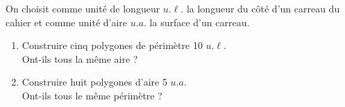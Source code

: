 \begin{exercice}
    On choisit comme unité de longueur $u.\ell.$ la longueur du côté d'un carreau du cahier et comme unité d'aire $u.a.$ la surface d'un carreau.
    \begin{enumerate}
       \item Construire cinq polygones de périmètre 10 $u.\ell.$ \\
          Ont-ils tous la même aire ?
       \item Construire huit polygones d'aire 5 $u.a.$ \\
          Ont-ils tous le même périmètre ?
    \end{enumerate}
 \end{exercice}
 
 